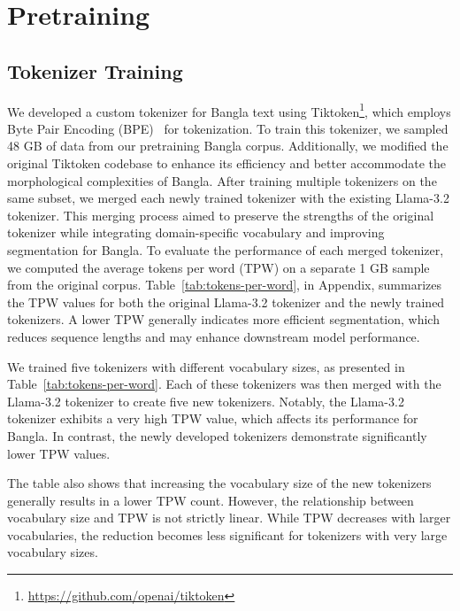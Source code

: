 \section{Pretraining}
\label{sec:pretraining}

\subsection{Tokenizer Training}
We developed a custom tokenizer for Bangla text using Tiktoken\footnote{\url{https://github.com/openai/tiktoken}}, which employs Byte Pair Encoding (BPE)~\cite{sennrich2015neural} for tokenization. To train this tokenizer, we sampled 48 GB of data from our pretraining Bangla corpus. Additionally, we modified the original Tiktoken codebase to enhance its efficiency and better accommodate the morphological complexities of Bangla. After training multiple tokenizers on the same subset, we merged each newly trained tokenizer with the existing Llama-3.2 tokenizer. This merging process aimed to preserve the strengths of the original tokenizer while integrating domain-specific vocabulary and improving segmentation for Bangla. To evaluate the performance of each merged tokenizer, we computed the average tokens per word (TPW) on a separate 1 GB sample from the original corpus. Table~\ref{tab:tokens-per-word}, in Appendix, summarizes the TPW values for both the original Llama-3.2 tokenizer and the newly trained tokenizers. A lower TPW generally indicates more efficient segmentation, which reduces sequence lengths and may enhance downstream model performance.

We trained five tokenizers with different vocabulary sizes, as presented in Table~\ref{tab:tokens-per-word}. Each of these tokenizers was then merged with the Llama-3.2 tokenizer to create five new tokenizers. Notably, the Llama-3.2 tokenizer exhibits a very high TPW value, which affects its performance for Bangla. In contrast, the newly developed tokenizers demonstrate significantly lower TPW values.

The table also shows that increasing the vocabulary size of the new tokenizers generally results in a lower TPW count. However, the relationship between vocabulary size and TPW is not strictly linear. While TPW decreases with larger vocabularies, the reduction becomes less significant for tokenizers with very large vocabulary sizes.


